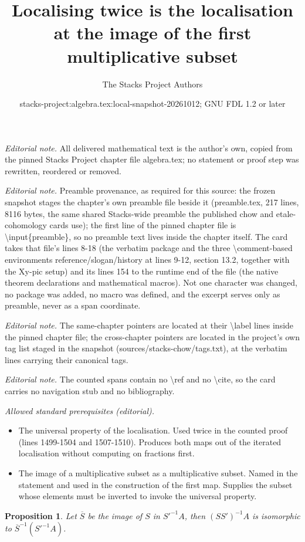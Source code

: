 \documentclass[10pt,a4paper]{amsart}
\title{Localising twice is the localisation at the image of the first multiplicative subset}
\author{The Stacks Project Authors}
\date{stacks-project:algebra.tex:local-snapshot-20261012; GNU FDL 1.2 or later}
\theoremstyle{plain}
\newtheorem{proposition}[subsection]{Proposition}
\theoremstyle{definition}
\theoremstyle{remark}
\numberwithin{equation}{subsection}
\begin{document}
\maketitle
\noindent\textit{Editorial note.} All delivered mathematical text is the author's own, copied from the pinned Stacks Project chapter file algebra.tex; no statement or proof step was rewritten, reordered or removed.\par\medskip
\noindent\textit{Editorial note.} Preamble provenance, as required for this source: the frozen snapshot stages the chapter's own preamble file beside it (preamble.tex, 217 lines, 8116 bytes, the same shared Stacks-wide preamble the published chow and etale-cohomology cards use); the first line of the pinned chapter file is \textbackslash{}input\{preamble\}, so no preamble text lives inside the chapter itself. The card takes that file's lines 8-18 (the verbatim package and the three \textbackslash{}comment-based environments reference/slogan/history at lines 9-12, section 13.2, together with the Xy-pic setup) and its lines 154 to the runtime end of the file (the native theorem declarations and mathematical macros). Not one character was changed, no package was added, no macro was defined, and the excerpt serves only as preamble, never as a span coordinate.\par\medskip
\noindent\textit{Editorial note.} The same-chapter pointers are located at their \textbackslash{}label lines inside the pinned chapter file; the cross-chapter pointers are located in the project's own tag list staged in the snapshot (sources/stacks-chow/tags.txt), at the verbatim lines carrying their canonical tags.\par\medskip
\noindent\textit{Editorial note.} The counted spans contain no \textbackslash{}ref and no \textbackslash{}cite, so the card carries no navigation stub and no bibliography.\par\medskip
\noindent\textit{Allowed standard prerequisites (editorial).}\begin{itemize}
\item The universal property of the localisation. Used twice in the counted proof (lines 1499-1504 and 1507-1510). Produces both maps out of the iterated localisation without computing on fractions first.
\item The image of a multiplicative subset as a multiplicative subset. Named in the statement and used in the construction of the first map. Supplies the subset whose elements must be inverted to invoke the universal property.
\end{itemize}\medskip
\begin{proposition}
\label{proposition-localize-twice}
Let $\overline{S}$ be the image of $S$ in $S'^{-1}A$, then
$(SS')^{-1}A$ is isomorphic to $\overline{S}^{-1}(S'^{-1}A)$.
\end{proposition}
\end{document}
